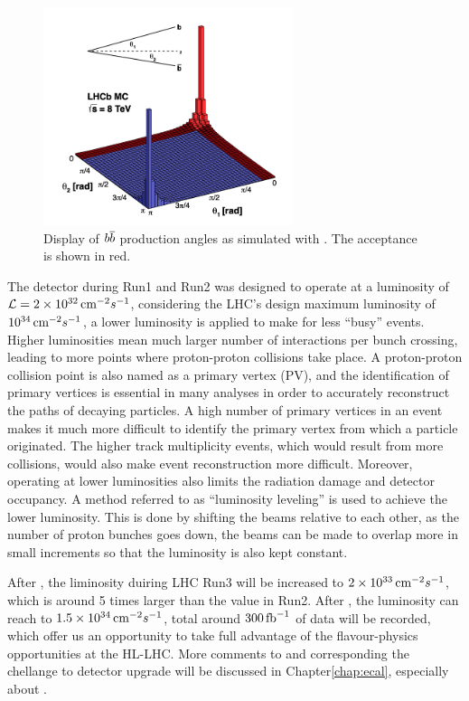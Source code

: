 \begin{figure}[!hbtp]
\centering
\includegraphics[width=0.65\textwidth]{Figures/02_Detector/BBbar}%
\caption{Display of ${b}{\overline {{b}}}$ production angles as simulated with .
The \lhcb acceptance is shown in red.}
\label{fig:BBar}
\end{figure}

The detector during Run1 and Run2 was designed to operate at a luminosity of $\mathcal{L}=2\times10^{32}\text{\,cm}^{-2}s^{-1}$, 
considering the LHC’s design maximum luminosity of $10^{34}\text{\,cm}^{-2}s^{-1}$, 
a lower luminosity is applied to make for less “busy” events. 
Higher luminosities mean much larger number of interactions per bunch crossing, 
leading to more points where proton-proton collisions take place. 
A proton-proton collision point is also named as a primary vertex (PV), 
and the identification of primary vertices is essential in many analyses in order to accurately reconstruct the paths of decaying particles. 
A high number of primary vertices in an event makes it much more difficult to identify the primary vertex from which a particle originated. 
The higher track multiplicity events, 
which would result from more collisions, 
would also make event reconstruction more difficult. 
Moreover, operating at lower luminosities also limits the radiation damage and detector occupancy. 
A method referred to as “luminosity leveling” is used to achieve the lower luminosity. 
This is done by shifting the beams relative to each other, 
as the number of proton bunches goes down, 
the beams can be made to overlap more in small increments so that the luminosity is also kept constant.

After \upgradeone, 
the liminosity duiring LHC Run3 will be increased to $2\times10^{33}\text{\,cm}^{-2}s^{-1}$,
which is around 5 times larger than the value in Run2\supercite{LHCb-TDR-012}.
After \upgradetwo,
the luminosity can reach to $1.5\times10^{34}\text{\,cm}^{-2}s^{-1}$,
total around $300\text{\,fb}^{-1}$ of data will be recorded, 
which offer us an opportunity to take full advantage of the flavour-physics opportunities at the HL-LHC\supercite{LHCb-PII-EoI,LHCb-PII-Physics}.
More comments to \upgradetwo and corresponding the chellange to detector upgrade will be discussed in Chapter\ref{chap:ecal},
especially about \ecal.


